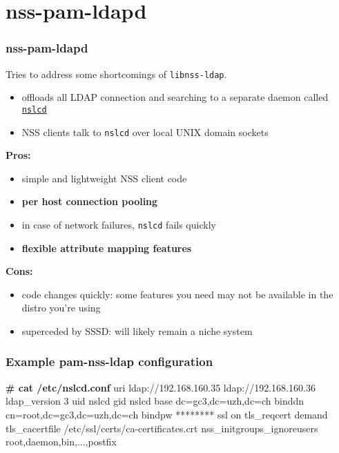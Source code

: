 \documentclass[english,serif,mathserif,usenames,dvipsnames]{beamer}
\begin{document}
\section{nss-pam-ldapd}
\begin{frame}
  \frametitle{nss-pam-ldapd}
  Tries to address some shortcomings of \texttt{libnss-ldap}.
  \begin{itemize}
  \item offloads all LDAP connection and searching to a separate daemon called \href{http://arthurdejong.org/nss-pam-ldapd/nslcd.8}{\texttt{nslcd}}
  \item NSS clients talk to \texttt{nslcd} over local UNIX domain sockets
  \end{itemize}

  \+
  \textbf{Pros:}
  \begin{itemize}
  \item simple and lightweight NSS client code
  \item \textbf{per host connection pooling}
  \item in case of network failures, \texttt{nslcd} fails quickly
  \item \textbf{flexible attribute mapping features}
  \end{itemize}

  \+
  \textbf{Cons:}
  \begin{itemize}
  \item code changes quickly: some features you need may not be available
    in the distro you're using
  \item superceded by SSSD: will likely remain a niche system
  \end{itemize}
\end{frame}


\begin{frame}[fragile]
  \frametitle{Example pam-nss-ldap configuration}
\begin{semiverbatim}\scriptsize
\textbf{# cat /etc/nslcd.conf}
uri ldap://192.168.160.35 ldap://192.168.160.36
ldap_version 3
uid nslcd
gid nslcd
base dc=gc3,dc=uzh,dc=ch
binddn cn=root,dc=gc3,dc=uzh,dc=ch
bindpw ********
ssl on
tls_reqcert demand
tls_cacertfile /etc/ssl/certs/ca-certificates.crt
nss_initgroups_ignoreusers root,daemon,bin,...,postfix
\end{semiverbatim}
\end{frame}
\end{document}
